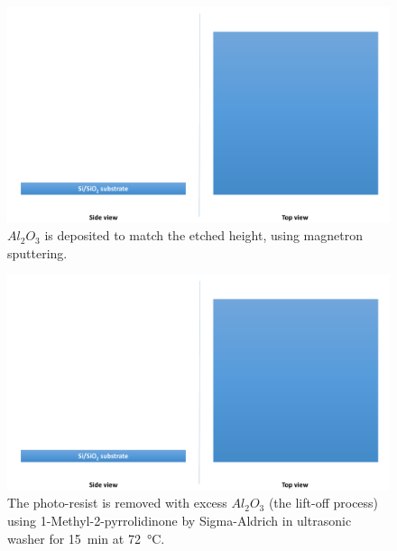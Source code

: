 \vfill
\begin{multicols}{2}[]
    
    \begin{figure}[H]
        \centering
        \includegraphics[width=0.375\paperwidth, page=13]{img/04/Manufacturing_under.pdf}
        \caption{$Al_2O_3$ is deposited to match the etched height, using magnetron sputtering.}
        \label{FabricationPillarOxide}
    \end{figure}
    
    \begin{figure}[H]
        \centering
        \includegraphics[width=0.375\paperwidth, page=14]{img/04/Manufacturing_under.pdf}
        \caption{The photo-resist is removed with excess $Al_2O_3$ (the lift-off process) using 1-Methyl-2-pyrrolidinone by Sigma-Aldrich in ultrasonic washer for \SI{15}{\minute} at \SI{72}{\celsius}.}
        \label{FabricationPillarLiftOff}
    \end{figure}
    
\end{multicols}
\newpage
